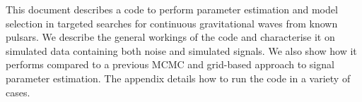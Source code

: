 This document describes a code to perform parameter estimation and model selection in targeted
searches for continuous gravitational waves from known pulsars. We describe the general
workings of the code and characterise it on simulated data containing both noise and
simulated signals. We also show how it performs compared to a previous MCMC and grid-based
approach to signal parameter estimation. The appendix details how to run the code in a variety of
cases. 